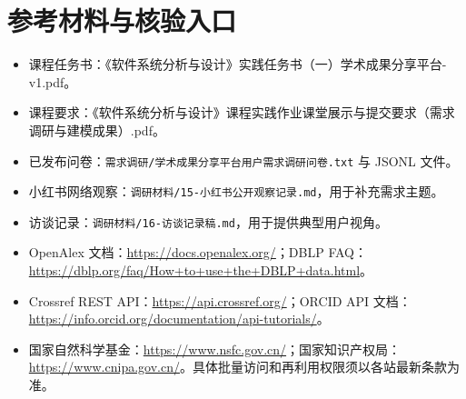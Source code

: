 \documentclass[UTF8,11pt,a4paper]{ctexart}
\begin{document}
\section*{参考材料与核验入口}
\begin{itemize}
\item 课程任务书：《软件系统分析与设计》实践任务书（一）学术成果分享平台-v1.pdf。
\item 课程要求：《软件系统分析与设计》课程实践作业课堂展示与提交要求（需求调研与建模成果）.pdf。
\item 已发布问卷：\texttt{需求调研/学术成果分享平台用户需求调研问卷.txt} 与 JSONL 文件。
\item 小红书网络观察：\texttt{调研材料/15-小红书公开观察记录.md}，用于补充需求主题。
\item 访谈记录：\texttt{调研材料/16-访谈记录稿.md}，用于提供典型用户视角。
\item OpenAlex 文档：\url{https://docs.openalex.org/}；DBLP FAQ：\url{https://dblp.org/faq/How+to+use+the+DBLP+data.html}。
\item Crossref REST API：\url{https://api.crossref.org/}；ORCID API 文档：\url{https://info.orcid.org/documentation/api-tutorials/}。
\item 国家自然科学基金：\url{https://www.nsfc.gov.cn/}；国家知识产权局：\url{https://www.cnipa.gov.cn/}。具体批量访问和再利用权限须以各站最新条款为准。
\end{itemize}
\end{document}
